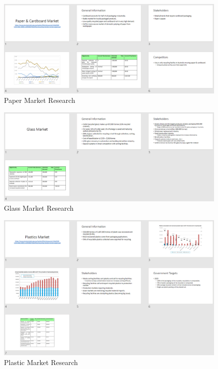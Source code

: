 \documentclass[11pt, a4, nocenter, margin=150mm]{article}
\begin{document}
\begin{appendices}
	\begin{figure}[h!]
		\centering
		\includegraphics[width=\textwidth]{week4/business_research_paper.png}
		\caption{Paper Market Research}
		\label{fig:paper}
	\end{figure}

	\begin{figure}[h!]
		\centering
		\includegraphics[width=\textwidth]{week4/business_research_glass.png}
		\caption{Glass Market Research}
		\label{fig:glass}
	\end{figure}

	\begin{figure}[h!]
		\centering
		\includegraphics[width=\textwidth]{week4/business_research_plastic.png}
		\caption{Plastic Market Research}
		\label{fig:plastic}
	\end{figure}


\end{appendices}
\end{document}
